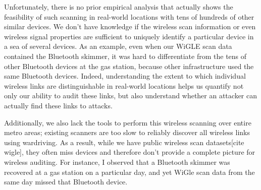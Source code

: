 Unfortunately, there is no prior empirical analysis that actually shows the feasibility of such scanning in real-world locations with tens of hundreds of other similar devices.
%
We don't have knowledge if the wireless scan information or even wireless signal properties are sufficient to uniquely identify a particular device in a sea of several devices.
%
As an example, even when our WiGLE scan data contained the Bluetooth skimmer, it was hard to differentiate from the tens of other Bluetooth devices at the gas station, because other infrastructure used the same Bluetooth devices.
%
Indeed, understanding the extent to which individual wireless links are distinguishable in real-world locations helps us quantify not only our ability to audit these links, but also understand whether an attacker can actually find these links to attacks.

Additionally, we also lack the tools to perform this wireless scanning over entire metro areas; existing scanners are too slow to reliably discover all wireless links using wardriving.
%
As a result, while we have public wireless scan datasets[cite wigle], they often miss devices and therefore don't provide a complete picture for wireless auditing.
%
For instance, I observed that a Bluetooth skimmer was recovered at a gas station on a particular day, and yet WiGle scan data from the same day missed that Bluetooth device. 
%




